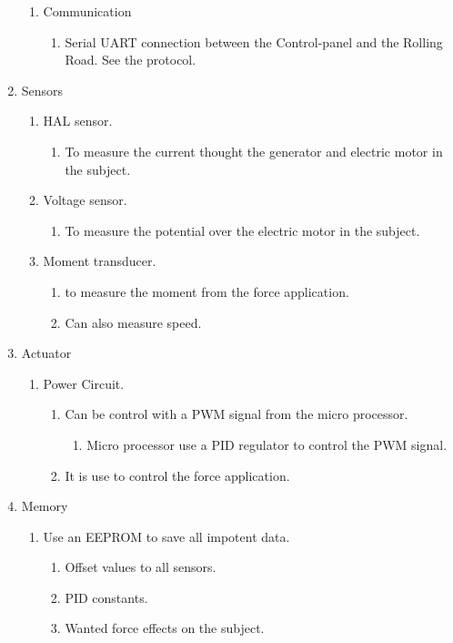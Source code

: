 \begin{enumerate}
\begin{enumerate}
		\item Communication
		\begin{enumerate}
			\item Serial UART connection between the Control-panel and the Rolling Road. See the protocol. 
		\end{enumerate}
	\end{enumerate}
	\item Sensors
	\begin{enumerate}
		\item HAL sensor.
		\begin{enumerate}
			\item To measure the current thought the generator and electric motor in the subject.
		\end{enumerate}
		\item Voltage sensor.
		\begin{enumerate}
			\item To measure the potential over the electric motor in the subject.    
		\end{enumerate}
		\item Moment transducer.
		\begin{enumerate}
			\item to measure the moment from the force application.
			\item Can also measure speed.
		\end{enumerate}
	\end{enumerate}
	\item Actuator
	\begin{enumerate}
		\item Power Circuit.
		\begin{enumerate}
			\item Can be control with a PWM signal from the micro processor.
			\begin{enumerate}
				\item Micro processor use a PID regulator to control the PWM signal.
			\end{enumerate}
			\item It is use to control the force application.
		\end{enumerate}
	\end{enumerate}
	\item Memory
	\begin{enumerate}
		\item Use an EEPROM to save all impotent data.
		\begin{enumerate}
			\item Offset values to all sensors.
			\item PID constants.
			\item Wanted force effects on the subject.
		\end{enumerate}
	\end{enumerate} 
\end{enumerate}
